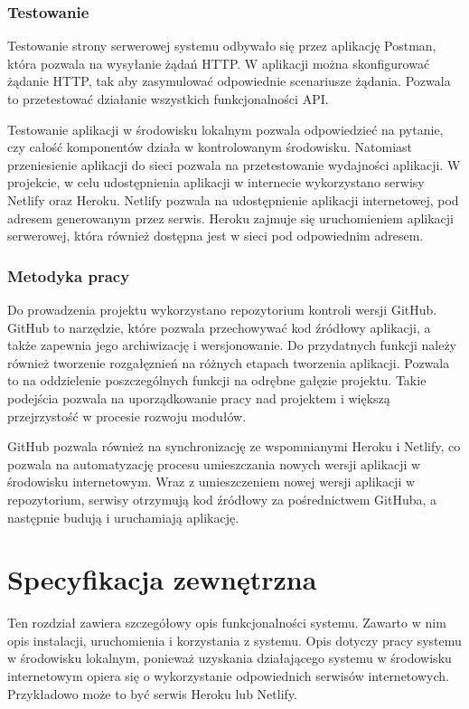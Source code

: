 \documentclass[a4paper,12pt]{book}
\begin{document}
\subsection{Testowanie}

Testowanie strony serwerowej systemu odbywało się przez aplikację Postman, która pozwala na wysyłanie żądań HTTP. W aplikacji można skonfigurować żądanie HTTP, tak aby zasymulować odpowiednie scenariusze żądania. Pozwala to przetestować działanie wszystkich funkcjonalności API.

Testowanie aplikacji w środowisku lokalnym pozwala odpowiedzieć na pytanie, czy całość komponentów działa w kontrolowanym środowisku. Natomiast przeniesienie aplikacji do sieci pozwala na przetestowanie wydajności aplikacji. W projekcie, w celu udostępnienia aplikacji w internecie wykorzystano serwisy Netlify oraz Heroku. Netlify pozwala na udostępnienie aplikacji internetowej, pod adresem generowanym przez serwis. Heroku zajmuje się uruchomieniem aplikacji serwerowej, która również dostępna jest w sieci pod odpowiednim adresem.

\subsection{Metodyka pracy}

Do prowadzenia projektu wykorzystano repozytorium kontroli wersji GitHub. GitHub to narzędzie, które pozwala przechowywać kod źródłowy aplikacji, a także zapewnia jego archiwizację i wersjonowanie. Do przydatnych funkcji należy również tworzenie rozgałęznień na różnych etapach tworzenia aplikacji. Pozwala to na oddzielenie poszczególnych funkcji na odrębne gałęzie projektu. Takie podejścia pozwala na uporządkowanie pracy nad projektem i większą przejrzystość w procesie rozwoju modułów.

GitHub pozwala również na synchronizację ze wspomnianymi Heroku i Netlify, co pozwala na automatyzację procesu umieszczania nowych wersji aplikacji w środowisku internetowym. Wraz z umieszczeniem nowej wersji aplikacji w repozytorium, serwisy otrzymują kod źródłowy za pośrednictwem GitHuba, a następnie budują i uruchamiają aplikację.

\chapter{Specyfikacja zewnętrzna}
Ten rozdział zawiera szczegółowy opis funkcjonalności systemu. Zawarto w nim opis instalacji, uruchomienia i korzystania z systemu. Opis dotyczy pracy systemu w środowisku lokalnym, ponieważ uzyskania działającego systemu w środowisku internetowym opiera się o wykorzystanie odpowiednich serwisów internetowych. Przykładowo może to być serwis Heroku lub Netlify.
\end{document}
